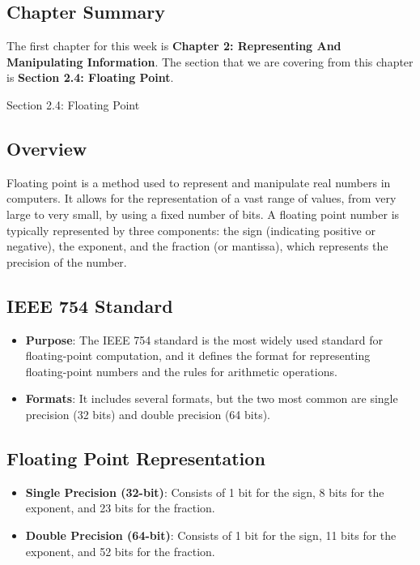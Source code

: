 \newpage

\subsection{Chapter Summary}

The first chapter for this week is \textbf{Chapter 2: Representing And Manipulating Information}. The section that we are covering from this chapter is \textbf{Section 2.4: Floating Point}.

\begin{notes}{Section 2.4: Floating Point}
    \subsection*{Overview}

    Floating point is a method used to represent and manipulate real numbers in computers. It allows for the representation of a vast range of values, from very large to very small, by using a fixed 
    number of bits. A floating point number is typically represented by three components: the sign (indicating positive or negative), the exponent, and the fraction (or mantissa), which represents 
    the precision of the number. \vspace*{1em}

    \subsection*{IEEE 754 Standard}

    \begin{itemize}
        \item \textbf{Purpose}: The IEEE 754 standard is the most widely used standard for floating-point computation, and it defines the format for representing floating-point numbers and the rules 
        for arithmetic operations.
        \item \textbf{Formats}: It includes several formats, but the two most common are single precision (32 bits) and double precision (64 bits).
    \end{itemize}

    \subsection*{Floating Point Representation}

    \begin{itemize}
        \item \textbf{Single Precision (32-bit)}: Consists of 1 bit for the sign, 8 bits for the exponent, and 23 bits for the fraction.
        \item \textbf{Double Precision (64-bit)}: Consists of 1 bit for the sign, 11 bits for the exponent, and 52 bits for the fraction.
    \end{itemize}


\end{notes}
